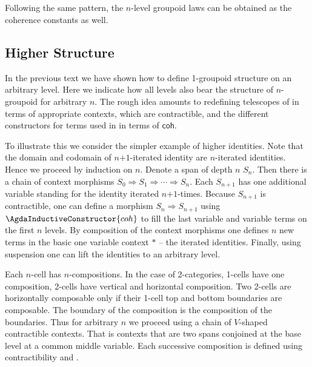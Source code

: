 \begin{code}\>\<%
\\
\> \<[14]%
\>[14]\AgdaSymbol{:} \AgdaSymbol{\}(} \AgdaSymbol{:}  \AgdaSymbol{)} \<[31]%
\>[31]\<%
\\
\>[13]\<[14]%
\>[14]  \AgdaSymbol{(}  \AgdaSymbol{)}\<%
\\
\>  \<[14]%
\>[14]\AgdaSymbol{=}    \<[37]%
\>[37]\<%
\\
\>\<\end{code}
Following the same pattern, the $n$-level groupoid laws can be
obtained as the coherence constants as well.

\subsection{Higher Structure} In the previous text we have shown how
to define 1-groupoid structure on an arbitrary level. Here we indicate
how all levels also bear the structure of $n$-groupoid for arbitrary
$n$. The rough idea amounts to redefining telescopes of \cite{txa:csl}
in terms of appropriate contexts, which are contractible, and the different
constructors for terms used in \cite{txa:csl} in terms of
$\mathsf{coh}$.

To illustrate this we consider the simpler example of higher
identities. Note that the domain and codomain of $n\text{+}1$-iterated
identity are $n$-iterated identities. Hence we proceed by induction on
$n$. Denote a span of depth $n$ $S_n$. Then there is a chain of
context morphisms $S_0 \Rightarrow S_1 \Rightarrow \cdots \Rightarrow
S_n$. Each $S_{n+1}$ has one additional variable standing for the
identity iterated $n\text{+}1$-times. Because $S_{n+1}$ is contractible, one
can define a morphism $S_n \Rightarrow S_{n+1}$ using $\AgdaInductiveConstructor{coh}$
to fill the last variable and variable terms on the first $n$
levels. By composition of the context morphisms one defines $n$ new
terms in the basic one variable context $*$ -- the iterated
identities. Finally, using suspension one can lift the identities to an
arbitrary level.

Each $n$-cell has $n$-compositions. In the case of
2-categories, 1-cells have one composition, 2-cells have vertical and
horizontal composition. Two 2-cells are horizontally composable only
if their 1-cell top and bottom boundaries are composable. The boundary
of the composition is the composition of the boundaries.  Thus for
arbitrary $n$ we proceed using a chain of $V$-shaped contractible
contexts. That is contexts that are two spans conjoined at the base
level at a common middle variable. Each successive composition is
defined using contractibility and .

